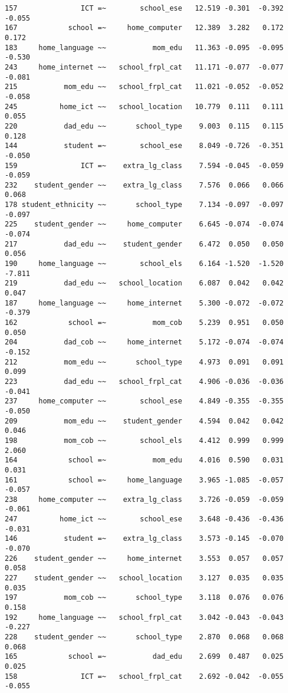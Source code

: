 \documentclass[
]{article}
\begin{document}
\begin{verbatim}
157               ICT =~        school_ese   12.519 -0.301  -0.392   -0.055
167            school =~     home_computer   12.389  3.282   0.172    0.172
183     home_language ~~           mom_edu   11.363 -0.095  -0.095   -0.530
243     home_internet ~~   school_frpl_cat   11.171 -0.077  -0.077   -0.081
215           mom_edu ~~   school_frpl_cat   11.021 -0.052  -0.052   -0.058
245          home_ict ~~   school_location   10.779  0.111   0.111    0.055
220           dad_edu ~~       school_type    9.003  0.115   0.115    0.128
144           student =~        school_ese    8.049 -0.726  -0.351   -0.050
159               ICT =~    extra_lg_class    7.594 -0.045  -0.059   -0.059
232    student_gender ~~    extra_lg_class    7.576  0.066   0.066    0.068
178 student_ethnicity ~~       school_type    7.134 -0.097  -0.097   -0.097
225    student_gender ~~     home_computer    6.645 -0.074  -0.074   -0.074
217           dad_edu ~~    student_gender    6.472  0.050   0.050    0.056
190     home_language ~~        school_els    6.164 -1.520  -1.520   -7.811
219           dad_edu ~~   school_location    6.087  0.042   0.042    0.047
187     home_language ~~     home_internet    5.300 -0.072  -0.072   -0.379
162            school =~           mom_cob    5.239  0.951   0.050    0.050
204           dad_cob ~~     home_internet    5.172 -0.074  -0.074   -0.152
212           mom_edu ~~       school_type    4.973  0.091   0.091    0.099
223           dad_edu ~~   school_frpl_cat    4.906 -0.036  -0.036   -0.041
237     home_computer ~~        school_ese    4.849 -0.355  -0.355   -0.050
209           mom_edu ~~    student_gender    4.594  0.042   0.042    0.046
198           mom_cob ~~        school_els    4.412  0.999   0.999    2.060
164            school =~           mom_edu    4.016  0.590   0.031    0.031
161            school =~     home_language    3.965 -1.085  -0.057   -0.057
238     home_computer ~~    extra_lg_class    3.726 -0.059  -0.059   -0.061
247          home_ict ~~        school_ese    3.648 -0.436  -0.436   -0.031
146           student =~    extra_lg_class    3.573 -0.145  -0.070   -0.070
226    student_gender ~~     home_internet    3.553  0.057   0.057    0.058
227    student_gender ~~   school_location    3.127  0.035   0.035    0.035
197           mom_cob ~~       school_type    3.118  0.076   0.076    0.158
192     home_language ~~   school_frpl_cat    3.042 -0.043  -0.043   -0.227
228    student_gender ~~       school_type    2.870  0.068   0.068    0.068
165            school =~           dad_edu    2.699  0.487   0.025    0.025
158               ICT =~   school_frpl_cat    2.692 -0.042  -0.055   -0.055

\end{verbatim}
\end{document}
